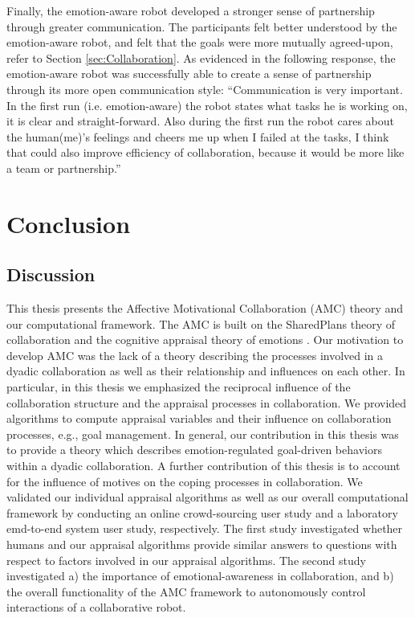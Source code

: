 \documentclass[12pt]{report}
\begin{document}
Finally, the emotion-aware robot developed a stronger sense of  partnership
through greater communication. The participants felt better understood by the
emotion-aware robot, and felt that the goals were more mutually agreed-upon,
refer to Section \ref{sec:Collaboration}. As evidenced in the following
response, the emotion-aware robot was successfully able to create a sense of
partnership through its more open communication style: ``Communication is very
important. In the first run (i.e. emotion-aware) the robot states what tasks he
is working on, it is clear and straight-forward. Also during the first run the
robot cares about the human(me)'s feelings and cheers me up when I failed at the
tasks, I think that could also improve efficiency of collaboration, because it
would be more like a team or partnership.''

\chapter{Conclusion}
\label{ch:conclusion}

\section{Discussion}
This thesis presents the Affective Motivational Collaboration (AMC) theory and
our computational framework. The AMC is built on the SharedPlans theory of
collaboration \cite{grosz:plans-discourse} and the cognitive appraisal theory of
emotions \cite{marsella:ema-process-model}
\cite{scherer:appraisal-processes}. Our motivation to develop AMC was the lack
of a theory describing the processes involved in a dyadic collaboration as well
as their relationship and influences on each other. In particular, in this
thesis we emphasized the reciprocal influence of the collaboration structure and
the appraisal processes in collaboration. We provided algorithms to compute
appraisal variables and their influence on collaboration processes, e.g., goal
management. In general, our contribution in this thesis was to provide a theory
which describes emotion-regulated goal-driven behaviors within a dyadic
collaboration. A further contribution of this thesis is to account for the
influence of motives on the coping processes in collaboration. We validated our
individual appraisal algorithms as well as our overall computational framework
by conducting an online crowd-sourcing user study and a laboratory emd-to-end
system user study, respectively. The first study investigated whether humans and
our appraisal algorithms provide similar answers to questions with respect to
factors involved in our appraisal algorithms. The second study investigated a)
the importance of emotional-awareness in collaboration, and b) the overall
functionality of the AMC framework to autonomously control interactions of a
collaborative robot.
\end{document}
